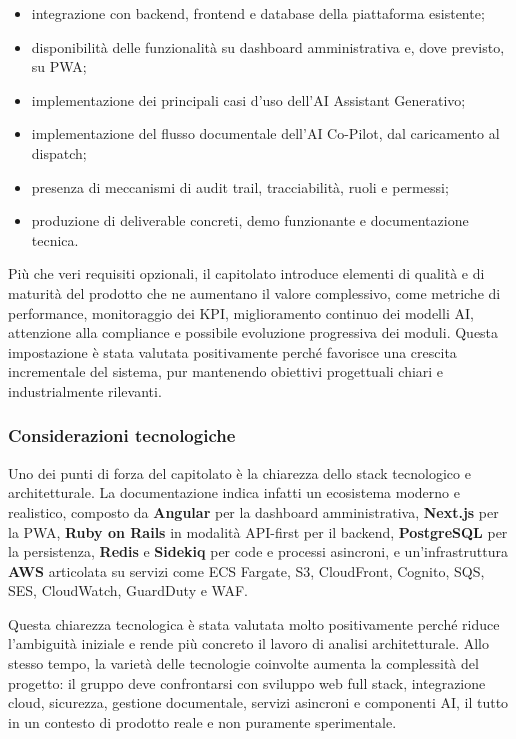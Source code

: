 \documentclass[a4paper,12pt]{article}
\begin{document}
\begin{itemize}
    \item integrazione con backend, frontend e database della piattaforma esistente;
    \item disponibilità delle funzionalità su dashboard amministrativa e, dove previsto, su PWA;
    \item implementazione dei principali casi d'uso dell'AI Assistant Generativo;
    \item implementazione del flusso documentale dell'AI Co-Pilot, dal caricamento al dispatch;
    \item presenza di meccanismi di audit trail, tracciabilità, ruoli e permessi;
    \item produzione di deliverable concreti, demo funzionante e documentazione tecnica.
\end{itemize}

Più che veri requisiti opzionali, il capitolato introduce elementi di qualità e di maturità del prodotto che ne aumentano il valore complessivo, come metriche di performance, monitoraggio dei KPI, miglioramento continuo dei modelli AI, attenzione alla compliance e possibile evoluzione progressiva dei moduli. Questa impostazione è stata valutata positivamente perché favorisce una crescita incrementale del sistema, pur mantenendo obiettivi progettuali chiari e industrialmente rilevanti.

\subsubsection{Considerazioni tecnologiche}

Uno dei punti di forza del capitolato è la chiarezza dello stack tecnologico e architetturale. La documentazione indica infatti un ecosistema moderno e realistico, composto da \textbf{Angular} per la dashboard amministrativa, \textbf{Next.js} per la PWA, \textbf{Ruby on Rails} in modalità API-first per il backend, \textbf{PostgreSQL} per la persistenza, \textbf{Redis} e \textbf{Sidekiq} per code e processi asincroni, e un'infrastruttura \textbf{AWS} articolata su servizi come ECS Fargate, S3, CloudFront, Cognito, SQS, SES, CloudWatch, GuardDuty e WAF.

Questa chiarezza tecnologica è stata valutata molto positivamente perché riduce l'ambiguità iniziale e rende più concreto il lavoro di analisi architetturale. Allo stesso tempo, la varietà delle tecnologie coinvolte aumenta la complessità del progetto: il gruppo deve confrontarsi con sviluppo web full stack, integrazione cloud, sicurezza, gestione documentale, servizi asincroni e componenti AI, il tutto in un contesto di prodotto reale e non puramente sperimentale.
\end{document}
